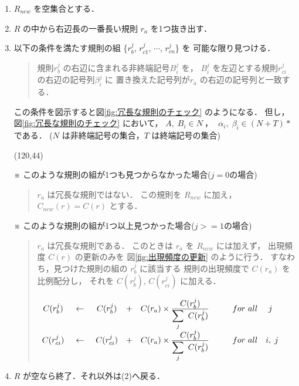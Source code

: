 \begin{enumerate}
\item
  $R_{new}$ を空集合とする．

\item
  $R$ の中から右辺長の一番長い規則 $r_a$ を1つ抜き出す．

\item
  以下の条件を満たす規則の組
  \{$r_b^j$, $r_{c1}^j$, $\cdots$, $r_{cn}^j$\} を
  可能な限り見つける．
  \begin{quote}
    規則$r_b^j$ の右辺に含まれる非終端記号$B_i^j$ を，
    $B_i^j$ を左辺とする規則$r_{ci}^j$ の右辺の記号列$\beta_i^j$ に
    置き換えた記号列が$r_a$ の右辺の記号列と一致する．
  \end{quote}

  この条件を図示すると図\ref{fig:冗長な規則のチェック} のようになる．
  但し，図\ref{fig:冗長な規則のチェック} において，
  $A, \; B_i \in N ~，~~~ \alpha_i, \; \beta_i \in (N+T)*$である．
  ($N$ は非終端記号の集合，$T$ は終端記号の集合)

  \bigskip
  \begin{center}
    \atari(120,44)
  \end{center}

  ※ このような規則の組が1つも見つからなかった場合($j=0$の場合)
  \begin{quote}
    $r_a$ は冗長な規則ではない．
    この規則を $R_{new}$ に加え，$C_{new}(r) = C(r)$ とする．
  \end{quote}
  ※ このような規則の組が1つ以上見つかった場合($j>=1$の場合)
  \begin{quote}
    $r_a$ は冗長な規則である．
    このときは $r_a$ を $R_{new}$ には加えず，
    出現頻度 $C(r)$ の更新のみを
    図\ref{fig:出現頻度の更新} のように行う．
    すなわち，見つけた規則の組の $r_b^j$ に該当する
    規則の出現頻度で $C(r_a)$ を比例配分し，
    それを $C(r_b^j)$, $C(r_{ci}^j)$ に加える．

    \bigskip
    \begin{center} $
      \begin{array}{c@{\hspace*{5mm}}c@{\hspace*{5mm}}ccc@{\hspace*{10mm}}l}
        C(r_b^j)    & \leftarrow & C(r_b^j)    & + &
          C(r_a) \times \frac{\displaystyle C(r_b^j)}
                             {\displaystyle \sum_j ~ C(r_b^j)} &
          for ~ all ~~~~ j \\[5mm]
        C(r_{ci}^j) & \leftarrow & C(r_{ci}^j) & + &
          C(r_a) \times \frac{\displaystyle C(r_b^j)}
                             {\displaystyle \sum_j ~ C(r_b^j)} &
          for ~ all ~~~ i, \; j \\
      \end{array} $
      \bigskip
    \end{center}
  \end{quote}

\item
  $R$ が空なら終了．それ以外は(2)へ戻る．
\end{enumerate}

